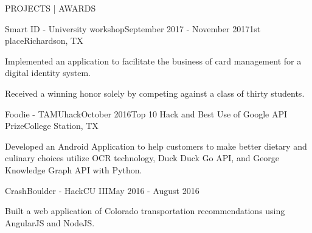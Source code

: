 \documentclass[10pt,a4paper, typewriter]{resume} %
\begin{document}
\begin{rSection}{PROJECTS | AWARDS}
\begin{rSubsection}{Smart ID - University workshop}{September 2017 - November 2017}{1st place}{Richardson, TX}
\item Implemented an application to facilitate the business of card management for a digital identity system.
\item Received a winning honor solely by competing against a class of thirty students.
\end{rSubsection}
\begin{rSubsection}{Foodie - TAMUhack}{October 2016}{Top 10 Hack and Best Use of Google API Prize}{College Station, TX}
\item Developed an Android Application to help customers to make better dietary and culinary choices utilize OCR technology, Duck Duck Go API, and George Knowledge Graph API with Python. 
\end{rSubsection}
\begin{rSubsection}{CrashBoulder - HackCU III}{May 2016 - August 2016}{}{}
\item Built a web application of Colorado transportation recommendations using AngularJS and NodeJS.
\end{rSubsection}
\end{rSection}
\end{document}
